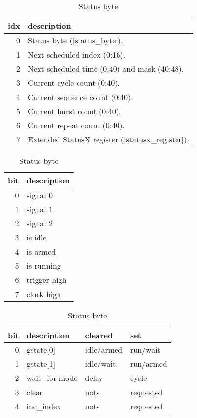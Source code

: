 \documentclass{article}
\begin{document}
\begin{table}[htb]
	\centering
  \begin{minipage}{.5\textwidth}
		\begin{tabular}{rl}
			idx &description\\\hline
			 0  &Status byte (\autoref{status_byte}).\\
			 1  &Next scheduled index (0:16).\\
			 2  &Next scheduled time (0:40) and mask (40:48).\\
			 3  &Current cycle count (0:40).\\
			 4  &Current sequence count (0:40).\\
			 5  &Current burst count (0:40).\\
			 6  &Current repeat count (0:40).\\
			 7  &Extended StatusX register (\autoref{statusx_register}).\\
			\end{tabular}
		\caption{Status register}
		\label{status_register}
		\vspace{10pt}
		\begin{tabular}{rl}
		bit &description\\\hline
		 0  & signal 0\\
		 1  & signal 1\\
		 2  & signal 2\\
		 3  & is idle\\
		 4  & is armed\\
		 5  & is running\\
		 6  & trigger high\\
		 7  & clock high\\
		\end{tabular}
		\caption{Status byte}
		\label{status_byte}
	\end{minipage}%
  \begin{minipage}{.5\textwidth}
		\begin{tabular}{rlll}
		bit & description     & cleared       &  set        \\\hline
		 0  & gstate[0]  	    & idle/armed    & run/wait    \\
		 1  & gstate[1]  	    & idle/wait			& run/armed   \\
		 2  & wait\_for mode  & delay  	  	  & cycle       \\
		 3  & clear  	  	    & not-  	  	  & requested   \\
		 4  & inc\_index  	  & not-	  	  	& requested   \\

\end{tabular}
\end{minipage}
\end{table}
\end{document}
